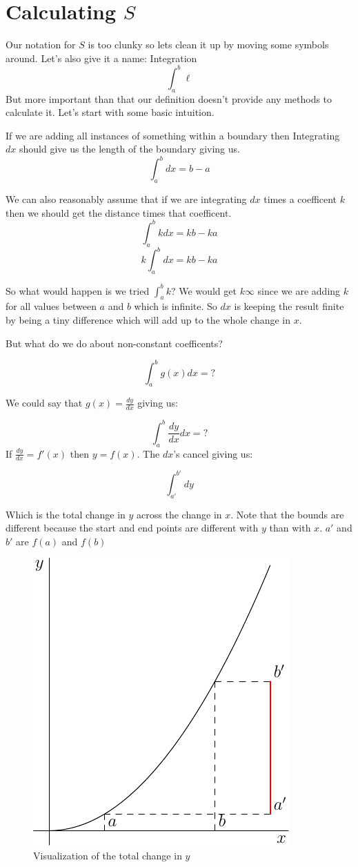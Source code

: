 \documentclass[12pt]{book}
\begin{document}
\chapter{Calculating $S$}
Our notation for $S$ is too clunky so lets clean it up by moving some symbols around. Let's also give it a name: Integration
$$\int_{a}^{b} \ell$$
But more important than that our definition doesn't provide any methods to calculate it. Let's start with some basic intuition.

If we are adding all instances of something within a boundary then Integrating $dx$ should give us the length of the boundary giving us.
$$\int_{a}^{b} dx = b-a$$

We can also reasonably assume that if we are integrating $dx$ times a coefficent $k$ then we should get the distance times that coefficent.
$$\int_{a}^{b} kdx = kb-ka$$
$$k\int_{a}^{b} dx = kb-ka$$

So what would happen is we tried $\int_{a}^{b} k$? We would get $k\infty$ since we are adding $k$ for all values between $a$ and $b$ which is infinite. So $dx$ is keeping the result finite by being a tiny difference which will add up to the whole change in $x$.

But what do we do about non-constant coefficents?

$$\int_{a}^{b} g(x)dx = ?$$

We could say that $g(x)=\frac{dy}{dx}$ giving us:

$$\int_{a}^{b} \frac{dy}{dx}dx = ?$$
If $\frac{dy}{dx} = f'(x)$ then $y = f(x)$.
The $dx$'s cancel giving us:

$$\int_{a'}^{b'} dy$$

Which is the total change in $y$ across the change in $x$. Note that the bounds are different because the start and end points are different with $y$ than with $x$. $a'$ and $b'$ are $f(a)$ and $f(b)$

\begin{figure}[h]
    \centering
    
	\includegraphics{./figures/3.1.pdf}
    
    \caption{Visualization of the total change in $y$}
\end{figure}
\end{document}
